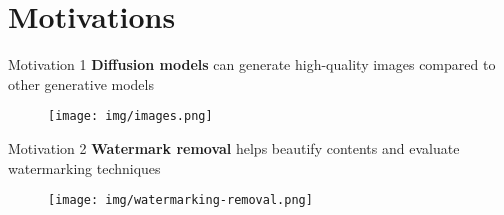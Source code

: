 \section{Motivations}
\begin{frame}{Motivation 1}
        \textbf{Diffusion models} can generate high-quality images compared to other generative models

        \begin{figure}    
        \centering        \texttt{[image: img/images.png]}
            \label{fig:enter-label}
        \end{figure}
\end{frame}

\begin{frame}{Motivation 2}
\textbf{Watermark removal} helps beautify contents and evaluate watermarking techniques

        \begin{figure}
        \centering
\texttt{[image: img/watermarking-removal.png]}
        \label{fig:enter-label}
    \end{figure}
\end{frame}
